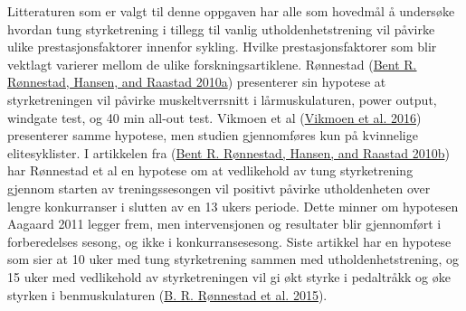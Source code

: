 \documentclass[
]{book}
\begin{document}
Litteraturen som er valgt til denne oppgaven har alle som hovedmål å
undersøke hvordan tung styrketrening i tillegg til vanlig
utholdenhetstrening vil påvirke ulike prestasjonsfaktorer innenfor
sykling. Hvilke prestasjonsfaktorer som blir vektlagt varierer mellom de
ulike forskningsartiklene. Rønnestad
(\protect\hyperlink{ref-ruxf8nnestad2010b}{Bent R. Rønnestad, Hansen,
and Raastad 2010a}) presenterer sin hypotese at styrketreningen vil
påvirke muskeltverrsnitt i lårmuskulaturen, power output, windgate test,
og 40 min all-out test. Vikmoen et al
(\protect\hyperlink{ref-vikmoen2016}{Vikmoen et al. 2016}) presenterer
samme hypotese, men studien gjennomføres kun på kvinnelige
elitesyklister. I artikkelen fra
(\protect\hyperlink{ref-ruxf8nnestad2010a}{Bent R. Rønnestad, Hansen,
and Raastad 2010b}) har Rønnestad et al en hypotese om at vedlikehold av
tung styrketrening gjennom starten av treningssesongen vil positivt
påvirke utholdenheten over lengre konkurranser i slutten av en 13 ukers
periode. Dette minner om hypotesen Aagaard 2011 legger frem, men
intervensjonen og resultater blir gjennomført i forberedelses sesong, og
ikke i konkurransesesong. Siste artikkel har en hypotese som sier at 10
uker med tung styrketrening sammen med utholdenhetstrening, og 15 uker
med vedlikehold av styrketreningen vil gi økt styrke i pedaltråkk og øke
styrken i benmuskulaturen (\protect\hyperlink{ref-ruxf8nnestad2015}{B.
R. Rønnestad et al. 2015}).
\end{document}
